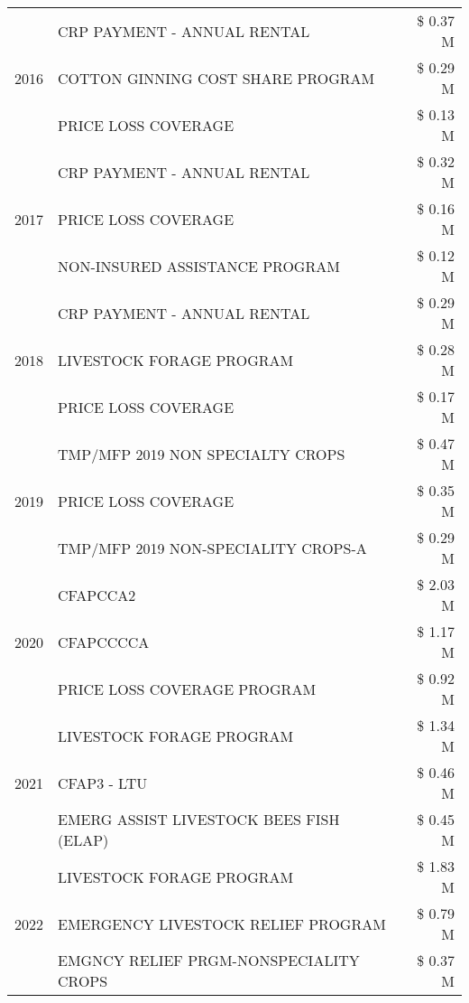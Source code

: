 \begin{tabular}{llr}
\cline{1-3}
\multirow[t]{3}{*}{2016} & CRP PAYMENT - ANNUAL RENTAL & \$ 0.37 M \\
 & COTTON GINNING COST SHARE PROGRAM & \$ 0.29 M \\
 & PRICE LOSS COVERAGE & \$ 0.13 M \\
\cline{1-3}
\multirow[t]{3}{*}{2017} & CRP PAYMENT - ANNUAL RENTAL & \$ 0.32 M \\
 & PRICE LOSS COVERAGE & \$ 0.16 M \\
 & NON-INSURED ASSISTANCE PROGRAM & \$ 0.12 M \\
\cline{1-3}
\multirow[t]{3}{*}{2018} & CRP PAYMENT - ANNUAL RENTAL & \$ 0.29 M \\
 & LIVESTOCK FORAGE PROGRAM & \$ 0.28 M \\
 & PRICE LOSS COVERAGE & \$ 0.17 M \\
\cline{1-3}
\multirow[t]{3}{*}{2019} & TMP/MFP 2019 NON SPECIALTY CROPS & \$ 0.47 M \\
 & PRICE LOSS COVERAGE & \$ 0.35 M \\
 & TMP/MFP 2019 NON-SPECIALITY CROPS-A & \$ 0.29 M \\
\cline{1-3}
\multirow[t]{3}{*}{2020} & CFAPCCA2 & \$ 2.03 M \\
 & CFAPCCCCA & \$ 1.17 M \\
 & PRICE LOSS COVERAGE PROGRAM & \$ 0.92 M \\
\cline{1-3}
\multirow[t]{3}{*}{2021} & LIVESTOCK FORAGE PROGRAM & \$ 1.34 M \\
 & CFAP3 - LTU & \$ 0.46 M \\
 & EMERG ASSIST LIVESTOCK BEES FISH (ELAP) & \$ 0.45 M \\
\cline{1-3}
\multirow[t]{3}{*}{2022} & LIVESTOCK FORAGE PROGRAM & \$ 1.83 M \\
 & EMERGENCY LIVESTOCK RELIEF PROGRAM & \$ 0.79 M \\
 & EMGNCY RELIEF PRGM-NONSPECIALITY CROPS & \$ 0.37 M \\
\cline{1-3}
\bottomrule
\end{tabular}
